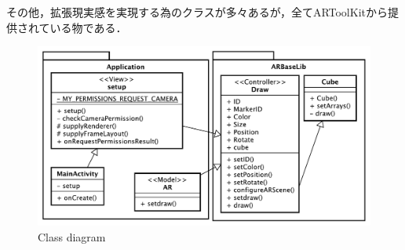 その他，拡張現実感を実現する為のクラスが多々あるが，全てARToolKitから提供されている物である．

\begin{figure}[tb]
\centering
\includegraphics[width=12cm]{fig/android.pdf}
\caption{Class diagram}
\label{fig:class}
\end{figure}


